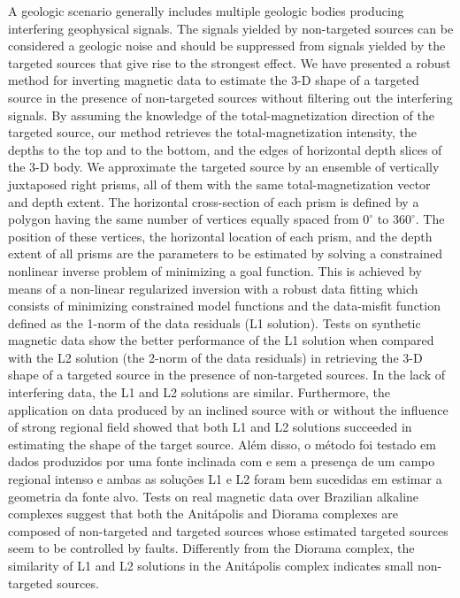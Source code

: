 \begin{foreignabstract}

A geologic scenario generally includes multiple geologic bodies producing interfering geophysical signals. 
The signals yielded by non-targeted sources can be considered a geologic noise and should be suppressed from signals yielded by the targeted sources that give rise to the strongest effect. 
We have presented a robust method for inverting magnetic data to estimate the 3-D shape of a targeted source in the presence of non-targeted sources without filtering out the interfering signals.
By assuming the knowledge of the total-magnetization direction of the targeted source, our method retrieves the total-magnetization intensity, the depths to the top and to the bottom, and the edges of horizontal depth slices of the 3-D body.
We approximate the targeted source by an 
ensemble of vertically juxtaposed right prisms, all of them with the same 
total-magnetization vector and depth extent. The horizontal cross-section 
of each prism is defined by a polygon having the same number of vertices 
equally spaced from $0^{\circ}$ to $360^{\circ}$. The position of these 
vertices, the horizontal location of each prism, and the depth extent of all prisms 
are the parameters to be estimated by solving a constrained nonlinear inverse problem 
of minimizing a goal function. 
This is achieved by means of a non-linear regularized inversion with a robust data fitting which consists of minimizing constrained model functions and the data-misfit function defined as the 1-norm of the data residuals (L1 solution).
Tests on synthetic magnetic data show the better performance of the L1 solution 
when compared with the L2 solution (the 2-norm of the data residuals) in retrieving the  3-D shape of a targeted source in the presence of non-targeted sources.
In the lack of interfering data, the L1 and L2 solutions are similar.
Furthermore, the application on data produced by an inclined source with or without the influence of strong regional field showed that both L1 and L2 solutions succeeded in estimating the shape of the target source.
Além disso, o método foi testado em dados produzidos por uma fonte inclinada com e sem a presença de um campo regional intenso e ambas as soluções L1 e L2 foram bem sucedidas em estimar a geometria da fonte alvo.
Tests on real magnetic data over Brazilian alkaline complexes suggest that both the Anit{\'a}polis and Diorama complexes are composed of non-targeted and targeted sources whose estimated targeted sources seem to be controlled by faults.
Differently from the Diorama complex, the similarity of L1 and L2 solutions in the Anit{\'a}polis complex indicates small non-targeted sources. 

\end{foreignabstract}

